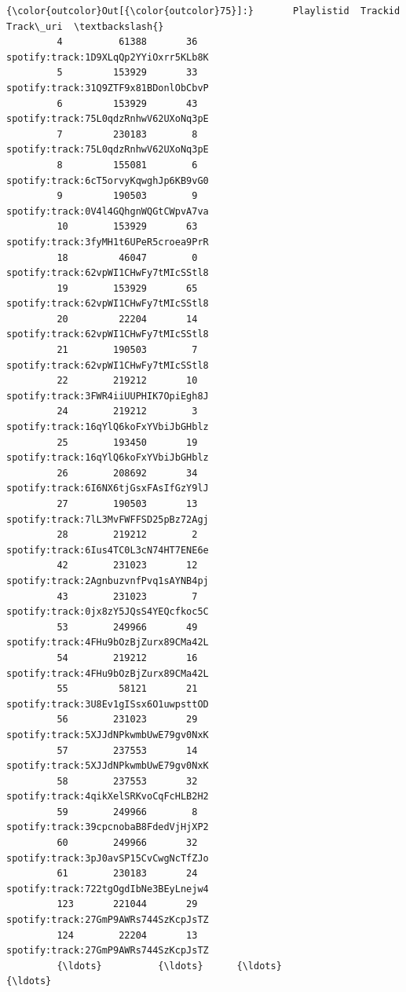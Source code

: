 \documentclass[11pt]{article}
\begin{document}
\begin{Verbatim}[commandchars=\\\{\}]
{\color{outcolor}Out[{\color{outcolor}75}]:}       Playlistid  Trackid                             Track\_uri  \textbackslash{}
         4          61388       36  spotify:track:1D9XLqQp2YYiOxrr5KLb8K   
         5         153929       33  spotify:track:31Q9ZTF9x81BDonlObCbvP   
         6         153929       43  spotify:track:75L0qdzRnhwV62UXoNq3pE   
         7         230183        8  spotify:track:75L0qdzRnhwV62UXoNq3pE   
         8         155081        6  spotify:track:6cT5orvyKqwghJp6KB9vG0   
         9         190503        9  spotify:track:0V4l4GQhgnWQGtCWpvA7va   
         10        153929       63  spotify:track:3fyMH1t6UPeR5croea9PrR   
         18         46047        0  spotify:track:62vpWI1CHwFy7tMIcSStl8   
         19        153929       65  spotify:track:62vpWI1CHwFy7tMIcSStl8   
         20         22204       14  spotify:track:62vpWI1CHwFy7tMIcSStl8   
         21        190503        7  spotify:track:62vpWI1CHwFy7tMIcSStl8   
         22        219212       10  spotify:track:3FWR4iiUUPHIK7OpiEgh8J   
         24        219212        3  spotify:track:16qYlQ6koFxYVbiJbGHblz   
         25        193450       19  spotify:track:16qYlQ6koFxYVbiJbGHblz   
         26        208692       34  spotify:track:6I6NX6tjGsxFAsIfGzY9lJ   
         27        190503       13  spotify:track:7lL3MvFWFFSD25pBz72Agj   
         28        219212        2  spotify:track:6Ius4TC0L3cN74HT7ENE6e   
         42        231023       12  spotify:track:2AgnbuzvnfPvq1sAYNB4pj   
         43        231023        7  spotify:track:0jx8zY5JQsS4YEQcfkoc5C   
         53        249966       49  spotify:track:4FHu9bOzBjZurx89CMa42L   
         54        219212       16  spotify:track:4FHu9bOzBjZurx89CMa42L   
         55         58121       21  spotify:track:3U8Ev1gISsx6O1uwpsttOD   
         56        231023       29  spotify:track:5XJJdNPkwmbUwE79gv0NxK   
         57        237553       14  spotify:track:5XJJdNPkwmbUwE79gv0NxK   
         58        237553       32  spotify:track:4qikXelSRKvoCqFcHLB2H2   
         59        249966        8  spotify:track:39cpcnobaB8FdedVjHjXP2   
         60        249966       32  spotify:track:3pJ0avSP15CvCwgNcTfZJo   
         61        230183       24  spotify:track:722tgOgdIbNe3BEyLnejw4   
         123       221044       29  spotify:track:27GmP9AWRs744SzKcpJsTZ   
         124        22204       13  spotify:track:27GmP9AWRs744SzKcpJsTZ   
         {\ldots}          {\ldots}      {\ldots}                                   {\ldots}   

\end{Verbatim}
\end{document}
